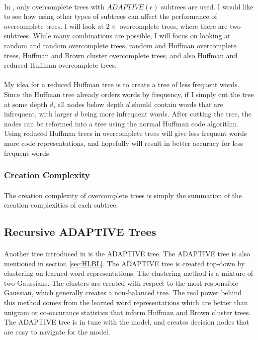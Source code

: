 \documentclass[12pt]{ociamthesis}  %
\begin{document}
\paragraph{}
In \cite{MnihHinton2009}, only overcomplete trees with $ADAPTIVE(\epsilon)$ subtrees are used. I would like to see how using other types of subtrees can affect the performance of overcomplete trees. I will look at $2\times$ overcomplete trees, where there are two subtrees. While many combinations are possible, I will focus on looking at random and random overcomplete trees, random and Huffman overcomplete trees, Huffman and Brown cluster overcomplete trees, and also Huffman and reduced Huffman overcomplete trees. 
\paragraph{}
My idea for a reduced Huffman tree is to create a tree of less frequent words. Since the Huffman tree already orders words by frequency, if I simply cut the tree at some depth $d$, all nodes below depth $d$ should contain words that are infrequent, with larger $d$ being more infrequent words. After cutting the tree, the nodes can be reformed into a tree using the normal Huffman code algorithm. Using reduced Huffman trees in overcomplete trees will give less frequent words more code representations, and hopefully will result in better accuracy for less frequent words.

\subsubsection{Creation Complexity}
\paragraph{}
The creation complexity of overcomplete trees is simply the summation of the creation complexities of each subtree.

\subsection{Recursive ADAPTIVE Trees}
\paragraph{}
Another tree introduced in \cite{MnihHinton2009} is the ADAPTIVE tree. The ADAPTIVE tree is also mentioned in section \ref{sec:HLBL}. The ADAPTIVE tree is created top-down by clustering on learned word representations. The clustering method is a mixture of two Gaussians. The clusters are created with respect to the most responsible Gaussian, which generally creates a non-balanced tree. The real power behind this method comes from the learned word representations which are better than unigram or co-occurance statistics that inform Huffman and Brown cluster trees. The ADAPTIVE tree is in tune with the model, and creates decision nodes that are easy to navigate for the model. 
\end{document}
